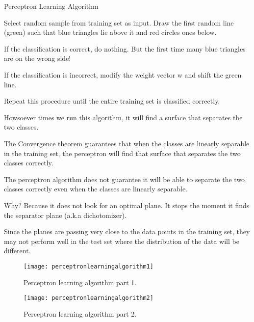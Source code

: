 Perceptron Learning Algorithm
	\begin{numberedlist}
		\item Select random sample from training set as input. Draw the first random line (green) such that blue triangles lie above it and red circles ones below.
		\item If the classification is correct, do nothing. But the first time many blue triangles are on the wrong side!
		\item If the classification is incorrect, modify the weight vector w and shift the green line.
		\item Repeat this procedure until the entire training set is classified correctly.
		\item Howsoever times we run this algorithm, it will find a surface that separates the two classes.
		\item The Convergence theorem guarantees that when the classes are linearly separable in the training set, the perceptron will find that surface that separates the two classes correctly.
		\item The perceptron algorithm does not guarantee it will be able to separate the two classes correctly even when the classes are linearly separable.
		\item Why? Because it does not look for an optimal plane. It stops the moment it finds the separator plane (a.k.a dichotomizer).
		\item Since the planes are passing very close to the data points in the training set, they may not perform well in the test set where the distribution of the data will be different.
	\end{numberedlist}

 	\begin{figure}[h]
		\centering
		\texttt{[image: perceptronlearningalgorithm1]}
		\caption[Perceptron learning algorithm part 1]{Perceptron learning algorithm part 1.}
		\label{fig:perceptronlearningalgorithm1}
	\end{figure}
 	\begin{figure}[h]
		\centering
		\texttt{[image: perceptronlearningalgorithm2]}
		\caption[Perceptron learning algorithm part 2]{Perceptron learning algorithm part 2.}
		\label{fig:perceptronlearningalgorithm2}
	\end{figure}

